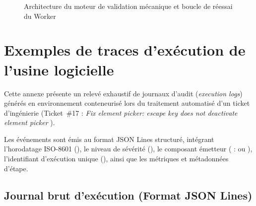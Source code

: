 \documentclass{tnreport}
\begin{document}
\begin{figure}[htbp]
\caption{Architecture du moteur de validation mécanique et boucle de réessai du Worker}
\label{fig:annexe_uml_usine_worker}
\end{figure}
\cleardoublepage

\chapter{Exemples de traces d'exécution de l'usine logicielle}
\label{annexe:traces}

Cette annexe présente un relevé exhaustif de journaux d'audit (\textit{execution logs}) générés en environnement conteneurisé lors du traitement automatisé d'un ticket d'ingénierie (Ticket~\#17 : \og \textit{Fix element picker: escape key does not deactivate element picker} \fg{}).

Les événements sont émis au format JSON Lines structuré, intégrant l'horodatage ISO-8601 (), le niveau de sévérité (), le composant émetteur ( :  ou ), l'identifiant d'exécution unique (), ainsi que les métriques et métadonnées d'étape.

\section{Journal brut d'exécution (Format JSON Lines)}
\label{annexe:sec_logs_bruts}
\end{document}
